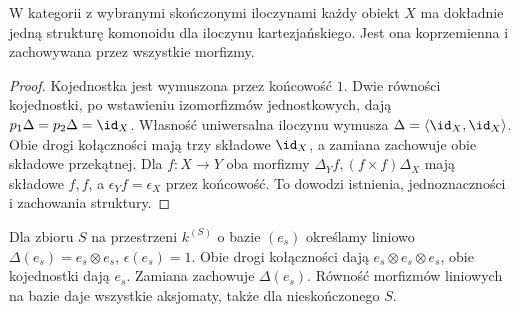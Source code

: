 \begin{twierdzenie}\label{cat:thm:cartesian-comonoid}
W kategorii z wybranymi skończonymi iloczynami każdy obiekt $X$ ma dokładnie jedną strukturę komonoidu dla iloczynu kartezjańskiego. Jest ona koprzemienna i zachowywana przez wszystkie morfizmy.
\end{twierdzenie}
\begin{proof}
Kojednostka jest wymuszona przez końcowość $1$. Dwie równości kojednostki, po wstawieniu izomorfizmów jednostkowych, dają $p_1\Delta=p_2\Delta=\id_X$. Własność uniwersalna iloczynu wymusza $\Delta=\langle\id_X,\id_X\rangle$. Obie drogi kołączności mają trzy składowe $\id_X$, a zamiana zachowuje obie składowe przekątnej. Dla $f:X\to Y$ oba morfizmy $\Delta_Y f,(f\times f)\Delta_X$ mają składowe $f,f$, a $\epsilon_Y f=\epsilon_X$ przez końcowość. To dowodzi istnienia, jednoznaczności i zachowania struktury.
\end{proof}
\begin{przyklad}
Dla zbioru $S$ na przestrzeni $k^{(S)}$ o bazie $(e_s)$ określamy liniowo $\Delta(e_s)=e_s\otimes e_s$, $\epsilon(e_s)=1$. Obie drogi kołączności dają $e_s\otimes e_s\otimes e_s$, obie kojednostki dają $e_s$. Zamiana zachowuje $\Delta(e_s)$. Równość morfizmów liniowych na bazie daje wszystkie aksjomaty, także dla nieskończonego $S$.
\end{przyklad}


